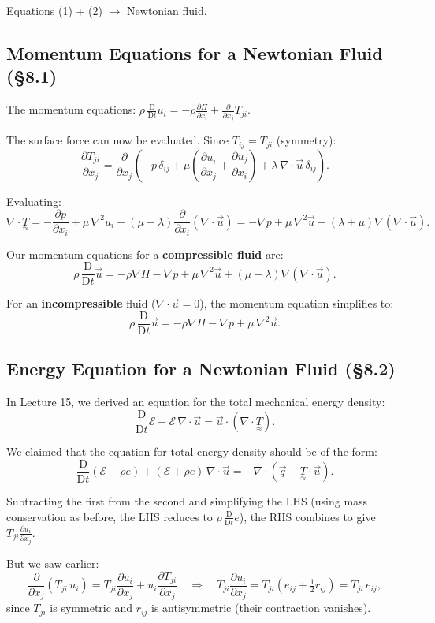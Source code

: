 \documentclass[11pt,a4paper]{article}
\newcommand{\D}{\mathrm{D}}
\newcommand{\Dt}{\frac{\D}{\D t}}
\newcommand{\pdx}[2]{\frac{\partial #1}{\partial #2}}
\newcommand{\uv}{\vec{u}}
\newcommand{\tens}[1]{\underset{\approx}{#1}}
\begin{document}
Equations (1) + (2) $\to$ Newtonian fluid.

\subsection{Momentum Equations for a Newtonian Fluid (\S8.1)}

The momentum equations: $\rho\,\Dt u_i = -\rho\pdx{\Pi}{x_i} + \pdx{}{x_j}T_{ji}$.

The surface force can now be evaluated. Since $T_{ij} = T_{ji}$ (symmetry):
\[
    \pdx{T_{ji}}{x_j} = \pdx{}{x_j}\left(-p\,\delta_{ij} + \mu\left(\pdx{u_i}{x_j} + \pdx{u_j}{x_i}\right) + \lambda\,\nabla\cdot\uv\,\delta_{ij}\right).
\]

Evaluating:
\[
    \nabla\cdot\tens{T} = -\pdx{p}{x_i} + \mu\,\nabla^2 u_i + (\mu + \lambda)\pdx{}{x_i}(\nabla\cdot\uv)
    = -\nabla p + \mu\,\nabla^2\uv + (\lambda + \mu)\nabla(\nabla\cdot\uv).
\]

Our momentum equations for a \textbf{compressible fluid} are:
\[
    \boxed{\rho\,\Dt\uv = -\rho\nabla\Pi - \nabla p + \mu\,\nabla^2\uv + (\mu + \lambda)\nabla(\nabla\cdot\uv).}
\]

For an \textbf{incompressible} fluid ($\nabla\cdot\uv = 0$), the momentum equation simplifies to:
\[
    \boxed{\rho\,\Dt\uv = -\rho\nabla\Pi - \nabla p + \mu\,\nabla^2\uv.}
\]

\subsection{Energy Equation for a Newtonian Fluid (\S8.2)}

In Lecture 15, we derived an equation for the total mechanical energy density:
\[
    \Dt\mathcal{E} + \mathcal{E}\,\nabla\cdot\uv = \uv\cdot(\nabla\cdot\tens{T}).
\]

We claimed that the equation for total energy density should be of the form:
\[
    \Dt(\mathcal{E} + \rho e) + (\mathcal{E} + \rho e)\,\nabla\cdot\uv = -\nabla\cdot(\vec{q} - \tens{T}\cdot\uv).
\]

Subtracting the first from the second and simplifying the LHS (using mass conservation as before, the LHS reduces to $\rho\,\Dt e$), the RHS combines to give $T_{ji}\pdx{u_i}{x_j}$.

But we saw earlier:
\[
    \pdx{}{x_j}(T_{ji}\,u_i) = T_{ji}\pdx{u_i}{x_j} + u_i\pdx{T_{ji}}{x_j}
    \quad \Longrightarrow \quad
    T_{ji}\pdx{u_i}{x_j} = T_{ji}(e_{ij} + \tfrac{1}{2}r_{ij}) = T_{ji}\,e_{ij},
\]
since $T_{ji}$ is symmetric and $r_{ij}$ is antisymmetric (their contraction vanishes).
\end{document}
